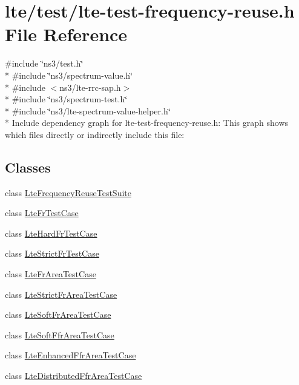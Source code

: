 \hypertarget{lte-test-frequency-reuse_8h}{}\section{lte/test/lte-\/test-\/frequency-\/reuse.h File Reference}
\label{lte-test-frequency-reuse_8h}
{\ttfamily \#include \char`\"{}ns3/test.\+h\char`\"{}}\\*
{\ttfamily \#include \char`\"{}ns3/spectrum-\/value.\+h\char`\"{}}\\*
{\ttfamily \#include $<$ns3/lte-\/rrc-\/sap.\+h$>$}\\*
{\ttfamily \#include \char`\"{}ns3/spectrum-\/test.\+h\char`\"{}}\\*
{\ttfamily \#include \char`\"{}ns3/lte-\/spectrum-\/value-\/helper.\+h\char`\"{}}\\*
Include dependency graph for lte-\/test-\/frequency-\/reuse.h\+:
This graph shows which files directly or indirectly include this file\+:
\subsection*{Classes}
\begin{DoxyCompactItemize}
\item 
class \hyperlink{classLteFrequencyReuseTestSuite}{Lte\+Frequency\+Reuse\+Test\+Suite}
\item 
class \hyperlink{classLteFrTestCase}{Lte\+Fr\+Test\+Case}
\item 
class \hyperlink{classLteHardFrTestCase}{Lte\+Hard\+Fr\+Test\+Case}
\item 
class \hyperlink{classLteStrictFrTestCase}{Lte\+Strict\+Fr\+Test\+Case}
\item 
class \hyperlink{classLteFrAreaTestCase}{Lte\+Fr\+Area\+Test\+Case}
\item 
class \hyperlink{classLteStrictFrAreaTestCase}{Lte\+Strict\+Fr\+Area\+Test\+Case}
\item 
class \hyperlink{classLteSoftFrAreaTestCase}{Lte\+Soft\+Fr\+Area\+Test\+Case}
\item 
class \hyperlink{classLteSoftFfrAreaTestCase}{Lte\+Soft\+Ffr\+Area\+Test\+Case}
\item 
class \hyperlink{classLteEnhancedFfrAreaTestCase}{Lte\+Enhanced\+Ffr\+Area\+Test\+Case}
\item 
class \hyperlink{classLteDistributedFfrAreaTestCase}{Lte\+Distributed\+Ffr\+Area\+Test\+Case}
\end{DoxyCompactItemize}
